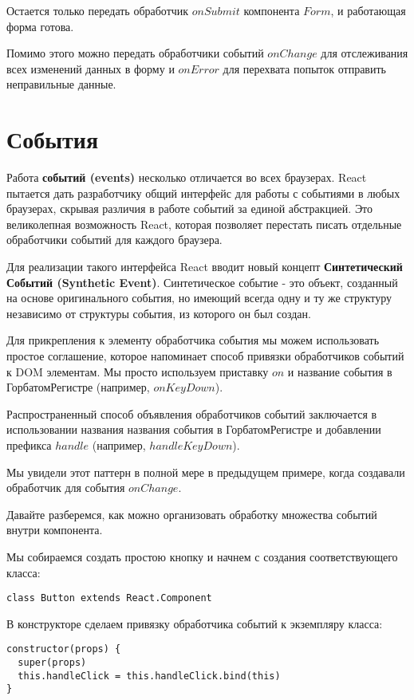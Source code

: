 Остается только передать обработчик $onSubmit$ компонента $Form$, и работающая форма готова.

Помимо этого можно передать обработчики событий $onChange$ для отслеживания всех изменений данных в форму и $onError$ для перехвата попыток отправить неправильные данные.

\section{События}

Работа \textbf{событий (events)} несколько отличается во всех браузерах. React пытается дать разработчику общий интерфейс для работы с событиями в любых браузерах, скрывая различия в работе событий за единой абстракцией. Это великолепная возможность React, которая позволяет перестать писать отдельные обработчики событий для каждого браузера.

Для реализации такого интерфейса React вводит новый концепт \textbf{Синтетический Событий (Synthetic Event)}. Синтетическое событие - это объект, созданный на основе оригинального события, но имеющий всегда одну и ту же структуру независимо от структуры события, из которого он был создан.

Для прикрепления к элементу обработчика события мы можем использовать простое соглашение, которое напоминает способ привязки обработчиков событий к DOM элементам. Мы просто используем приставку $on$ и название события в ГорбатомРегистре (например, $onKeyDown$). 

Распространенный способ объявления обработчиков событий заключается в использовании названия названия события в ГорбатомРегистре и добавлении префикса $handle$ (например, $handleKeyDown$).

Мы увидели этот паттерн в полной мере в предыдущем примере, когда создавали обработчик для события $onChange$.

Давайте разберемся, как можно организовать обработку множества событий внутри компонента.

Мы собираемся создать простою кнопку и начнем с создания соответствующего класса:

\begin{lstlisting}
class Button extends React.Component
\end{lstlisting}

В конструкторе сделаем привязку обработчика событий к экземпляру класса:

\begin{lstlisting}
constructor(props) {
  super(props)
  this.handleClick = this.handleClick.bind(this)
}
\end{lstlisting}


